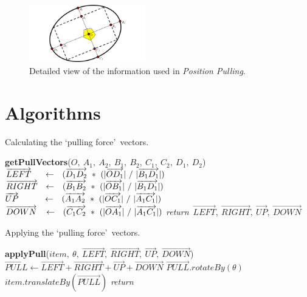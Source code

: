 \documentclass[twocolumn,compsoc]{cvm}
\newcommand{\INDSTATE}[1][1]{\STATE\hspace{#1\algorithmicindent}}
\begin{document}
\begin{figure}[h!]
 \centering
   \includegraphics[width=0.45\textwidth]{figures/DetailedPositionPulling.jpeg}
   \caption{Detailed view of the information used in {\emph{Position Pulling}}.}
   \label{fig:pullLayoutExp}
\end{figure}

\section*{Algorithms}

\begin{algorithm}[h!]
\caption{Calculating the \lq pulling force\rq~vectors.}
\label{algo:pullLayoutOne}
\begin{algorithmic}
\STATE \textbf{getPullVectors}($O,\ A_{1},\ A_{2},\ B_{1},\ B_{2},\ C_{1},\ C_{2},\ D_{1},\ D_{2}$)
\INDSTATE[2]$\overrightarrow{LEFT}\hspace{0.5cm} \leftarrow \hspace{0.25cm}(\overrightarrow{D_{1}D_{2}}\ *\ ( |\overrightarrow{OD_{1}}|\  /\ |\overrightarrow{B_{1}D_{1}}| )$
\INDSTATE[2]$\overrightarrow{RIGHT}\hspace{0.25cm} \leftarrow \hspace{0.25cm}(\overrightarrow{B_{1}B_{2}}\ *\ ( |\overrightarrow{OB_{1}}|\  /\ |\overrightarrow{B_{1}D_{1}}| )$
\INDSTATE[2]$\overrightarrow{UP}\hspace{1cm} \leftarrow \hspace{0.25cm}(\overrightarrow{A_{1}A_{2}}\ *\ ( |\overrightarrow{OC_{1}}|\  /\ |\overrightarrow{A_{1}C_{1}}| )$
\INDSTATE[2]$\overrightarrow{DOWN}\hspace{0.3cm} \leftarrow \hspace{0.25cm}(\overrightarrow{C_{1}C_{2}}\ *\ ( |\overrightarrow{OA_{1}}|\  /\ |\overrightarrow{A_{1}C_{1}}| )$
\STATE \textit{return}\ $\overrightarrow{LEFT},\ \overrightarrow{RIGHT},\ \overrightarrow{UP},\ \overrightarrow{DOWN}$
\end{algorithmic}
\end{algorithm}

\begin{algorithm}[h!]
\caption{Applying the \lq pulling force\rq~vectors.}
\label{algo:pullLayoutTwo}
\begin{algorithmic}
\STATE \textbf{applyPull}($item,\ \theta,\ \overrightarrow{LEFT},\ \overrightarrow{RIGHT},\ \overrightarrow{UP},\ \overrightarrow{DOWN}$)
\INDSTATE[2]$\overrightarrow{PULL} \leftarrow \overrightarrow{LEFT} + \overrightarrow{RIGHT} + \overrightarrow{UP} + \overrightarrow{DOWN}$
\INDSTATE[2]$\overrightarrow{PULL}.rotateBy(\theta)$
\INDSTATE[2]$item.translateBy(\overrightarrow{PULL})$
\STATE \textit{return}
\end{algorithmic}
\end{algorithm}
\end{document}
